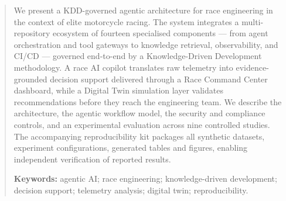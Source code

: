 \begin{abstract}
We present a KDD-governed agentic architecture for race engineering in the context
of elite motorcycle racing. The system integrates a multi-repository ecosystem of
fourteen specialised components --- from agent orchestration and tool gateways to
knowledge retrieval, observability, and CI/CD --- governed end-to-end by a
Knowledge-Driven Development methodology. A race AI copilot translates raw
telemetry into evidence-grounded decision support delivered through a Race Command
Center dashboard, while a Digital Twin simulation layer validates recommendations
before they reach the engineering team. We describe the architecture, the agentic
workflow model, the security and compliance controls, and an experimental evaluation
across nine controlled studies. The accompanying reproducibility kit packages all
synthetic datasets, experiment configurations, generated tables and figures,
enabling independent verification of reported results.

\textbf{Keywords:} agentic AI; race engineering; knowledge-driven development;
decision support; telemetry analysis; digital twin; reproducibility.
\end{abstract}

